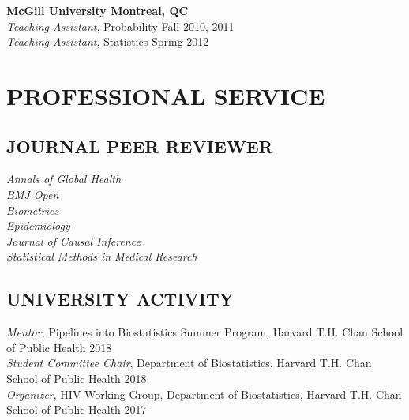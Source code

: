 \documentclass[12pt]{article}
\begin{document}
\textbf{McGill University \hfill \hfill Montreal, QC}\\
\textit{Teaching Assistant}, Probability \hfill \hfill Fall 2010, 2011 \\
\textit{Teaching Assistant}, Statistics \hfill \hfill Spring 2012 

%

\section*{\textbf{{\large P}{ROFESSIONAL} {\large S}{ERVICE}}}
\subsection*{\textbf{JOURNAL PEER REVIEWER}}
\textit{Annals of Global Health} \\ 
\textit{BMJ Open} \\ 
\textit{Biometrics} \\
\textit{Epidemiology} \\
\textit{Journal of Causal Inference} \\ 
\textit{Statistical Methods in Medical Research}

\subsection*{\textbf{UNIVERSITY ACTIVITY}}
\textit{Mentor}, Pipelines into Biostatistics Summer Program, Harvard T.H. Chan School of
Public Health \hfill \hfill 2018 \\
\textit{Student Committee Chair}, Department of Biostatistics, Harvard T.H. Chan School of
Public Health \hfill \hfill 2018 \\
\textit{Organizer}, HIV Working Group, Department of Biostatistics, Harvard T.H. Chan School of
Public Health \hfill \hfill 2017 
\end{document}
